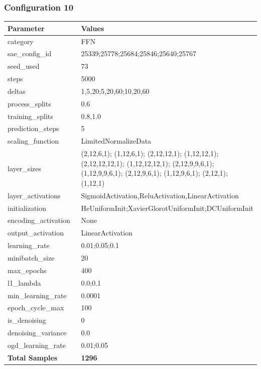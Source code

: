 \documentclass[a4paper,11pt,oneside]{article}
\theoremstyle{plain}
\theoremstyle{definition}
\begin{document}
	\newpage
	\subsubsection{Configuration 10}\label{config10}
	\begin{longtable}[H]{|p{0.3\linewidth}|p{0.7\linewidth}|} \hline 			\rowcolor{beaublue}\textbf{Parameter} &\textbf{Values} \\\hline{category} & {FFN} \\\hline
		{sae\_config\_id} & {25339;25778;25684;25846;25640;25767} \\\hline
		{seed\_used} & {73} \\\hline
		{steps} & {5000} \\\hline
		{deltas} & {1,5,20;5,20,60;10,20,60} \\\hline
		{process\_splits} & {0.6} \\\hline
		{training\_splits} & {0.8,1.0} \\\hline
		{prediction\_steps} & {5} \\\hline
		{scaling\_function} & {LimitedNormalizeData} \\\hline
		{layer\_sizes} & {(2,12,6,1); (1,12,6,1); (2,12,12,1); (1,12,12,1); (2,12,12,12,1); (1,12,12,12,1); (2,12,9,9,6,1); (1,12,9,9,6,1); (2,12,9,6,1); (1,12,9,6,1); (2,12,1); (1,12,1)} \\\hline
		{layer\_activations} & {SigmoidActivation,ReluActivation,LinearActivation} \\\hline
		{initialization} & {HeUniformInit;XavierGlorotUniformInit;DCUniformInit} \\\hline
		{encoding\_activation} & {None} \\\hline
		{output\_activation} & {LinearActivation} \\\hline
		{learning\_rate} & {0.01;0.05;0.1} \\\hline
		{minibatch\_size} & {20} \\\hline
		{max\_epochs} & {400} \\\hline
		{l1\_lambda} & {0.0;0.1} \\\hline
		{min\_learning\_rate} & {0.0001} \\\hline
		{epoch\_cycle\_max} & {100} \\\hline
		{is\_denoising} & {0} \\\hline
		{denoising\_variance} & {0.0} \\\hline
		{ogd\_learning\_rate} & {0.01;0.05} \\\hline
		{\textbf{Total Samples}} & {\textbf{1296}} \\\hline
	\end{longtable}
	
\end{document}
